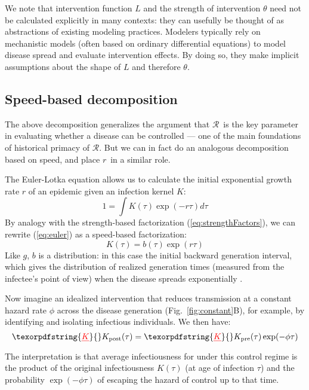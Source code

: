 \documentclass[12pt]{article}
\newcommand{\RR}{\ensuremath{{\mathcal R}}}
\newcommand{\KK}{\ensuremath{{K}}} %
\newcommand{\Kx}[1]{\ensuremath{\KK_{\mathrm{#1}}}} %
\newcommand{\Kpre}{\Kx{pre}} %
\newcommand{\Kpost}{\Kx{post}} %
\newcommand{\rr}{\ensuremath{{r}}}
\newcommand{\figref}[1]{Fig.~\ref{fig:#1}}
\renewcommand{\eqref}[1]{(\ref{eq:#1})} %
\newcommand{\eqlab}[1]{\label{eq:#1}}
\providecommand{\DIFaddtex}[1]{{\protect\color{blue}\uwave{#1}}} %
\providecommand{\DIFdeltex}[1]{{\protect\color{red}\sout{#1}}}                      %
\providecommand{\DIFaddbegin}{} %
\providecommand{\DIFaddend}{} %
\providecommand{\DIFdelbegin}{} %
\providecommand{\DIFdelend}{} %
\providecommand{\DIFadd}[1]{\texorpdfstring{\DIFaddtex{#1}}{#1}} %
\providecommand{\DIFdel}[1]{\texorpdfstring{\DIFdeltex{#1}}{}} %
\newcommand{\DIFscaledelfig}{0.5}
\newlength{\DIFdelgraphicswidth} %
\newlength{\DIFdelgraphicsheight} %
\newcommand{\DIFaddincludegraphics}[2][]{{\color{blue}\fbox{\DIFOincludegraphics[#1]{#2}}}} %
\newcommand{\DIFdelincludegraphics}[2][]{%
\sbox{\DIFdelgraphicsbox}{\DIFOincludegraphics[#1]{#2}}%
\settoboxwidth{\DIFdelgraphicswidth}{\DIFdelgraphicsbox} %
\settoboxtotalheight{\DIFdelgraphicsheight}{\DIFdelgraphicsbox} %
\scalebox{\DIFscaledelfig}{%
\parbox[b]{\DIFdelgraphicswidth}{\usebox{\DIFdelgraphicsbox}\\[-\baselineskip] \rule{\DIFdelgraphicswidth}{0em}}\llap{\resizebox{\DIFdelgraphicswidth}{\DIFdelgraphicsheight}{%
\setlength{\unitlength}{\DIFdelgraphicswidth}%
\begin{picture}(1,1)%
\thicklines\linethickness{2pt} %
{\color[rgb]{1,0,0}\put(0,0){\framebox(1,1){}}}%
{\color[rgb]{1,0,0}\put(0,0){\line( 1,1){1}}}%
{\color[rgb]{1,0,0}\put(0,1){\line(1,-1){1}}}%
\end{picture}%
}\hspace*{3pt}}} %
} %
\DeclareRobustCommand{\DIFaddbegin}{\DIFOaddbegin \let\includegraphics\DIFaddincludegraphics} %
\DeclareRobustCommand{\DIFaddend}{\DIFOaddend \let\includegraphics\DIFOincludegraphics} %
\DeclareRobustCommand{\DIFdelbegin}{\DIFOdelbegin \let\includegraphics\DIFdelincludegraphics} %
\DeclareRobustCommand{\DIFdelend}{\DIFOaddend \let\includegraphics\DIFOincludegraphics} %
\begin{document}
We note that intervention function $L$ and the strength of intervention $\theta$ need not be calculated explicitly in many contexts: they can usefully be thought of as abstractions of existing modeling practices.
Modelers typically rely on mechanistic models (often based on ordinary differential equations) to model disease spread and evaluate intervention effects.
By doing so, they make implicit assumptions about the shape of $L$ and therefore $\theta$.

\subsection{Speed-based decomposition}

The above decomposition generalizes the argument that \RR\ is the key parameter in evaluating whether a disease can be controlled --- one of the main foundations of historical primacy of \RR. But we can in fact do an analogous decomposition based on speed, and place \rr\ in a similar role.

The Euler-Lotka equation allows us to calculate the initial exponential growth rate $r$ of an epidemic given an infection kernel $K$:
\begin{equation}
	1 = \int K(\tau) \exp(-r\tau) d\tau
	\eqlab{euler}
\end{equation}
By analogy with the strength-based factorization \eqref{strengthFactors}, we can rewrite \eqref{euler} as a speed-based factorization:
\begin{equation}
K(\tau) = b(\tau)\exp(r\tau)
\eqlab{Kback}
\end{equation}
Like $g$, $b$ is a distribution: in this case the initial backward generation interval, which gives the distribution of realized generation times (measured from the infectee's point of view) when the disease spreads exponentially \citep{champredon2015intrinsic, britton2019estimation}.

Now imagine an idealized intervention that reduces transmission at a constant hazard rate $\phi$ across the disease generation (\figref{constant}B), for example, by identifying and isolating infectious individuals.
We then have:
\begin{equation}
	\DIFdelbegin %
\DIFdel{K}\DIFdelend \DIFaddbegin \Kpost\DIFaddend (\tau) = \DIFdelbegin \DIFdel{K}\DIFdelend \DIFaddbegin \Kpre\DIFaddend (\tau)\exp(-\phi\tau)
\end{equation}
The interpretation is that average infectiousness for under this control regime is the product of the original infectiousness \DIFdelbegin \DIFdel{$K(\tau)$ }\DIFdelend \DIFaddbegin \DIFadd{$\Kpre(\tau)$ }\DIFaddend (at age of infection $\tau$) and the probability $\exp(-\phi\tau)$ of escaping the hazard of control up to that time.
\end{document}
